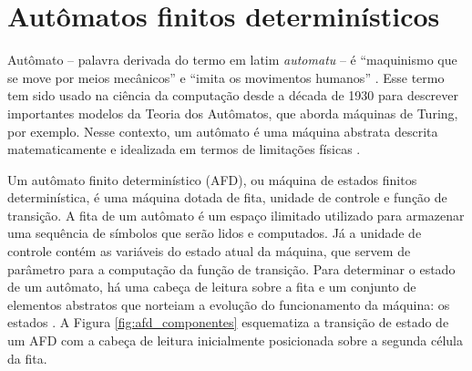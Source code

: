 \section{Autômatos finitos determinísticos}
\label{sec:afd}

Autômato -- palavra derivada do termo em latim \textit{automatu} -- é ``maquinismo que se move por meios mecânicos'' e ``imita os movimentos humanos'' \cite[p. 81]{aurelio}. Esse termo tem sido usado na ciência da computação desde a década de 1930 para descrever importantes modelos da Teoria dos Autômatos, que aborda máquinas de Turing, por exemplo. Nesse contexto, um autômato é uma máquina abstrata descrita matematicamente e idealizada em termos de limitações físicas \cite{hopcroft}.

Um autômato finito determinístico (\acs{AFD}), ou máquina de estados finitos determinística, é uma máquina dotada de fita, unidade de controle e função de transição. A fita de um autômato é um espaço ilimitado utilizado para armazenar uma sequência de símbolos que serão lidos e computados. Já a unidade de controle contém as variáveis do estado atual da máquina, que servem de parâmetro para a computação da função de transição. Para determinar o estado de um autômato, há uma cabeça de leitura sobre a fita e um conjunto de elementos abstratos que norteiam a evolução do funcionamento da máquina: os estados \cite{hopcroft}. A Figura \ref{fig:afd_componentes} esquematiza a transição de estado de um AFD com a cabeça de leitura inicialmente posicionada sobre a segunda célula da fita.


